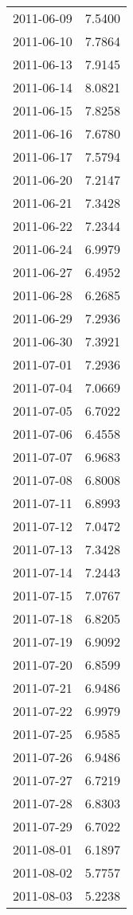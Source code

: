 \begin{tabular}{lr}
2011-06-09 &      7.5400 \\
2011-06-10 &      7.7864 \\
2011-06-13 &      7.9145 \\
2011-06-14 &      8.0821 \\
2011-06-15 &      7.8258 \\
2011-06-16 &      7.6780 \\
2011-06-17 &      7.5794 \\
2011-06-20 &      7.2147 \\
2011-06-21 &      7.3428 \\
2011-06-22 &      7.2344 \\
2011-06-24 &      6.9979 \\
2011-06-27 &      6.4952 \\
2011-06-28 &      6.2685 \\
2011-06-29 &      7.2936 \\
2011-06-30 &      7.3921 \\
2011-07-01 &      7.2936 \\
2011-07-04 &      7.0669 \\
2011-07-05 &      6.7022 \\
2011-07-06 &      6.4558 \\
2011-07-07 &      6.9683 \\
2011-07-08 &      6.8008 \\
2011-07-11 &      6.8993 \\
2011-07-12 &      7.0472 \\
2011-07-13 &      7.3428 \\
2011-07-14 &      7.2443 \\
2011-07-15 &      7.0767 \\
2011-07-18 &      6.8205 \\
2011-07-19 &      6.9092 \\
2011-07-20 &      6.8599 \\
2011-07-21 &      6.9486 \\
2011-07-22 &      6.9979 \\
2011-07-25 &      6.9585 \\
2011-07-26 &      6.9486 \\
2011-07-27 &      6.7219 \\
2011-07-28 &      6.8303 \\
2011-07-29 &      6.7022 \\
2011-08-01 &      6.1897 \\
2011-08-02 &      5.7757 \\
2011-08-03 &      5.2238 \\

\end{tabular}
